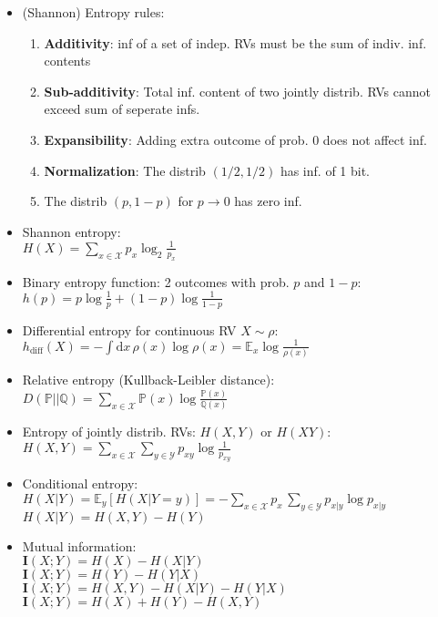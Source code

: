 \documentclass[twocolumn,9pt]{extarticle}
\begin{document}
\begin{itemize}
	\item (Shannon) Entropy rules:
		\begin{enumerate}
			\item \textbf{Additivity}: inf of a set of indep. RVs must be the sum of indiv. inf. contents 
			\item \textbf{Sub-additivity}: Total inf. content of two jointly distrib. RVs cannot exceed sum of seperate infs.
			\item \textbf{Expansibility}: Adding extra outcome of prob. 0 does not affect inf.
			\item \textbf{Normalization}: The distrib $(1/2,1/2)$ has inf. of 1 bit.
			\item The distrib $(p, 1-p)$ for $p \to 0$ has zero inf.
		\end{enumerate}

	\item Shannon entropy:\\
	$H(X) = \sum_{x \in \mathcal{X}} p_x \log_2 \frac{1}{p_x}$

	\item Binary entropy function: 2 outcomes with prob. $p$ and $1-p$: \\
	$h(p) = p \log \frac{1}{p} + (1 - p) \log \frac{1}{1-p}$

	\item Differential entropy for continuous RV $X \sim \rho$:\\
	$h_{\text{diff}}(X) = - \int \mathrm{d}x\, \rho(x) \log \rho(x) = \mathbb{E}_x \log \frac{1}{\rho(x)}$

	\item Relative entropy (Kullback-Leibler distance): \\
	$D(\mathbb{P}||\mathbb{Q}) = \sum_{x \in \mathcal{X}} \mathbb{P}(x) \log \frac{\mathbb{P}(x)}{\mathbb{Q}(x)}$

	\item Entropy of jointly distrib. RVs: $H(X,Y)$ or $H(XY)$: \\
	$H(X,Y) = \sum_{x \in \mathcal{X}} \sum_{y \in \mathcal{Y}} p_{xy} \log \frac{1}{p_{xy}}$

	\item Conditional entropy: \\
	$H(X|Y) = \mathbb{E}_y[H(X|Y = y)] = - \sum_{x \in \mathcal{X}} p_x\, \sum_{y \in \mathcal{Y}} p_{x|y} \log p_{x|y}$ \\
	$H(X|Y) = H(X,Y) - H(Y)$
	
	\item Mutual information: \\
	$\mathbf{I}(X;Y) = H(X) - H(X|Y)$\\
	$\mathbf{I}(X;Y) = H(Y) - H(Y|X)$\\
	$\mathbf{I}(X;Y) = H(X,Y) - H(X|Y) - H(Y|X)$\\
	$\mathbf{I}(X;Y) = H(X) + H(Y) - H(X,Y)$\\


\end{itemize}
\end{document}
